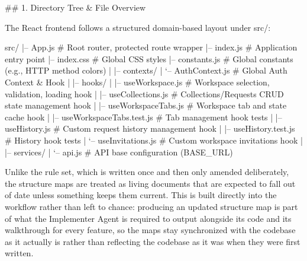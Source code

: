\begin{listing}[H]
\begin{center}
\begin{promptbox}
## 1. Directory Tree & File Overview

The React frontend follows a structured domain-based layout under src/:

src/
|-- App.js              # Root router, protected route wrapper
|-- index.js             # Application entry point
|-- index.css             # Global CSS styles
|-- constants.js            # Global constants (e.g., HTTP method colors)
|
|-- contexts/
|   `-- AuthContext.js         # Global Auth Context & Hook
|
|-- hooks/
|   |-- useWorkspace.js        # Workspace selection, validation, loading hook
|   |-- useCollections.js       # Collections/Requests CRUD state management hook
|   |-- useWorkspaceTabs.js      # Workspace tab and state cache hook
|   |-- useWorkspaceTabs.test.js   # Tab management hook tests
|   |-- useHistory.js         # Custom request history management hook
|   |-- useHistory.test.js      # History hook tests
|   `-- useInvitations.js       # Custom workspace invitations hook
|
|-- services/
|   `-- api.js            # API base configuration (BASE_URL)
\end{promptbox}
\end{center}
\caption{Excerpt of \texttt{FRONTEND\_STRUCTURE.md} showing the directory tree and file overview.}
\label{lst:frontend-structure-tree}
\end{listing}

Unlike the rule set, which is written once and then only amended deliberately, the structure maps are treated as living documents that are expected to fall out of date unless something keeps them current. This is built directly into the workflow rather than left to chance: producing an updated structure map is part of what the Implementer Agent is required to output alongside its code and its walkthrough for every feature, so the maps stay synchronized with the codebase as it actually is rather than reflecting the codebase as it was when they were first written.

